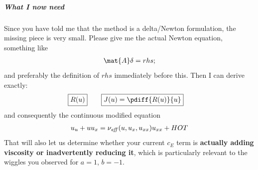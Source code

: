 \documentclass{mooiman_memo}
\begin{document}
\subparagraph*{What I now need}

Since you have told me that the method is a delta/Newton formulation, the missing piece is very small. Please give me the actual Newton equation, something like
\begin{align}
\mat{A}  \delta = rhs;
\end{align}
and preferably the definition of $rhs$ immediately before this.
%
Then I can derive exactly:
\begin{align}
    &\boxed{
        R(u)
    }
    \qquad
    \boxed{
    J(u) = \pdiff{R(u)}{u}
    }
\end{align}
%
and consequently the continuous modified equation
\begin{align}
    u_u + uu_x = \nu_{\it eff}(u, u_x, u_{xx}) u_{xx} + HOT
\end{align}
%
That will also let us determine whether your current $c_E$ term is\textbf{ actually adding viscosity or inadvertently reducing it}, which is particularly relevant to the wiggles you observed for $a=1$, $b=-1$.
\end{document}
